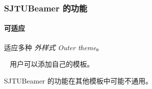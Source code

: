 \documentclass{ctexbeamer}
\begin{document}
\begin{frame}
  \frametitle{SJTUBeamer 的功能}

  \paragraph{可适应} 适应多种 \emph{外样式 Outer theme}。

  ~
  用户可以添加自己的\alert{模板}。

   SJTUBeamer 的功能在其他模板中可能不通用。
\end{frame}
\end{document}
